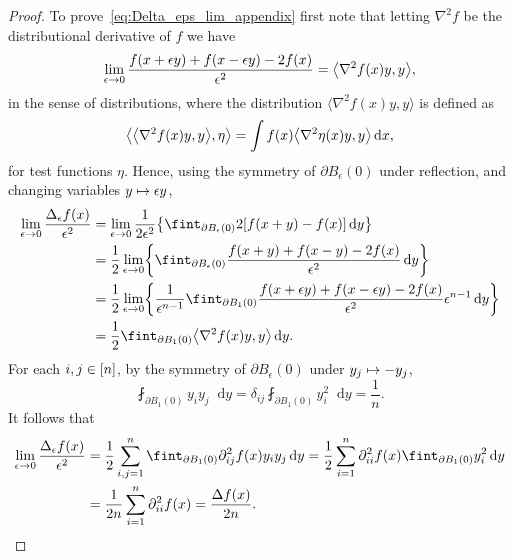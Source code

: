 \documentclass[10pt]{amsart}
\theoremstyle{definition}\newtheorem{defi}[theo]{Definition}\newtheorem{rema}[theo]{Remark}\newtheorem{exam}[theo]{Example}\newtheorem{exem}[theo]{Example}\newtheorem{nota}[theo]{Notation}
\newcommand{\dd}{n}
\newcommand*\diff{\mathop{}\!\mathrm{d}}
\newcommand{\avgint}{\fint}
\renewcommand*{\to}{\mathchoice{\longrightarrow}{\rightarrow}{\rightarrow}{\rightarrow}}
\let\oldmapsto\mapsto
\renewcommand*{\mapsto}{\mathchoice{\longmapsto}{\oldmapsto}{\oldmapsto}{\oldmapsto}}
\let\originalleft\left
\let\originalright\right
\renewcommand{\left}{\mathopen{}\mathclose\bgroup\originalleft}
\renewcommand{\right}{\aftergroup\egroup\originalright}
\let\oldin\in
\renewcommand{\in}{\mathchoice{\oldin}{\oldin}{\,\oldin\,}{\,\oldin\,}}
\begin{document}
\begin{proof}
To prove~\eqref{eq:Delta_eps_lim_appendix} first note that letting $ \nabla^2f$ be the distributional derivative of $f$ we have
\begin{align*}
\lim_{\epsilon\to 0}\frac{f(x+\epsilon y)+f(x-\epsilon y)-2f(x)}{\epsilon^2}=\left\langle \nabla^2f(x)y,y\right\rangle,
\end{align*}
in the sense of distributions, where the distribution $\langle \nabla^{2} f(x)y, y \rangle$ is defined as
\[
\left \langle \left\langle \nabla^{2} f(x)y, y \right\rangle, \eta \right \rangle =\int f(x) \left\langle \nabla^{2} \eta(x) y, y \right\rangle \diff x,
\]
for test functions $\eta$. Hence, using the symmetry of $\partial B_{\epsilon}(0)$ under reflection, and changing variables $y\mapsto \epsilon y$,
\begin{align*}
\lim_{\epsilon\to 0}\frac{\Delta_{\epsilon}f(x)}{\epsilon^2}&=\lim_{\epsilon\to 0}\frac{1}{2\epsilon^2}\left\{\avgint_{\partial B_{\epsilon}(0)}2[f(x+y)-f(x)]\diff y\right\}\\
&=\frac{1}{2}\lim_{\epsilon\to 0}\left\{\avgint_{\partial B_{\epsilon}(0)}\frac{f(x+y)+f(x-y)-2f(x)}{\epsilon^2}\diff y\right\}\\
&=\frac{1}{2}\lim_{\epsilon\to 0}\left\{\frac{1}{\epsilon^{\dd-1}}\avgint_{\partial B_{1}(0)}\frac{f(x+\epsilon y)+f(x-\epsilon y)-2f(x)}{\epsilon^2}\epsilon^{\dd-1}\diff y\right\}\\
&=\frac{1}{2}\avgint_{\partial B_{1}(0)}\left\langle \nabla^2f(x)y,y\right\rangle \diff y.
\end{align*}
For each $i,j\in [\dd]$, by the symmetry of $\partial B_{\epsilon}(0)$ under $y_j\mapsto -y_j$,
\[
\avgint_{\partial B_{1}(0)}y_iy_j \diff y=\delta_{ij}\avgint_{\partial B_{1}(0)}y_i^2 \diff y=\frac{1}{\dd}.
\]
It follows that
\begin{align*}
\lim_{\epsilon\to 0}\frac{\Delta_{\epsilon}f(x)}{\epsilon^2}&=\frac{1}{2}\sum_{i,j=1}^{\dd}\avgint_{\partial B_{1}(0)}\partial_{ij}^2f(x)y_iy_j \diff y=\frac{1}{2}\sum_{i=1}^{\dd}\partial_{ii}^2f(x)\avgint_{\partial B_{1}(0)}y_i^2\diff y\\
&=\frac{1}{2\dd}\sum_{i=1}^{\dd}\partial_{ii}^2f(x)=\frac{\Delta f(x)}{2\dd}.
\end{align*}




\end{proof}
\end{document}
